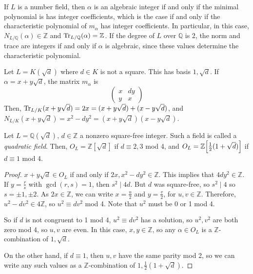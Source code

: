 If \( L \) is a number field, then \( \alpha \) is an algebraic integer if and only if the minimal polynomial is has integer coefficients, which is the case if and only if the characteristic polynomial of \( m_\alpha \) has integer coefficients.
In particular, in this case, \( N_{L/\mathbb Q}(\alpha) \in \mathbb Z \) and \( \Tr_{L/\mathbb Q}(\alpha) = \mathbb Z \).
If the degree of \( L \) over \( \mathbb Q \) is 2, the norm and trace are integers if and only if \( \alpha \) is algebraic, since these values determine the characteristic polynomial.
\begin{example}
    Let \( L = K(\sqrt{d}) \) where \( d \in K \) is not a square.
    This has basis \( 1, \sqrt d \).
    If \( \alpha = x + y\sqrt d \), the matrix \( m_\alpha \) is
    \[ \begin{pmatrix}
        x & dy \\
        y & x
    \end{pmatrix} \]
    Then, \( \Tr_{L/K}(x+y\sqrt d) = 2x = (x+y\sqrt d) + (x-y\sqrt d) \), and \( N_{L/K}(x+y\sqrt d) = x^2 - dy^2 = (x+y\sqrt d)(x - y\sqrt d) \).
\end{example}
\begin{lemma}
    Let \( L = \mathbb Q(\sqrt{d}) \), \( d \in \mathbb Z \) a nonzero square-free integer.
    Such a field is called a \emph{quadratic field}.
    Then, \( O_L = \mathbb Z[\sqrt d] \) if \( d \equiv 2, 3 \) mod 4, and \( O_L = \mathbb Z\qty[\frac{1}{2}(1+\sqrt d)] \) if \( d \equiv 1 \) mod 4.
\end{lemma}
\begin{proof}
    \( x + y \sqrt d \in O_L \) if and only if \( 2x, x^2 - dy^2 \in \mathbb Z \).
    This implies that \( 4 dy^2 \in \mathbb Z \).
    If \( y = \frac{r}{s} \) with \( \gcd(r,s) = 1 \), then \( s^2 \mid 4d \).
    But \( d \) was square-free, so \( s^2 \mid 4 \) so \( s = \pm 1, \pm 2 \).
    As \( 2x \in \mathbb Z \), we can write \( x = \frac{u}{2} \) and \( y = \frac{v}{2} \), for \( u, v \in \mathbb Z \).
    Therefore, \( u^2 - dv^2 \in 4\mathbb Z \), so \( u^2 \equiv dv^2 \) mod 4.
    Note that \( u^2 \) must be 0 or 1 mod 4.
    
    So if \( d \) is not congruent to 1 mod 4, \( u^2 \equiv dv^2 \) has a solution, so \( u^2, v^2 \) are both zero mod 4, so \( u, v \) are even.
    In this case, \( x, y \in \mathbb Z \), so any \( \alpha \in O_L \) is a \( \mathbb Z \)-combination of \( 1, \sqrt d \).

    On the other hand, if \( d \equiv 1 \), then \( u, v \) have the same parity mod 2, so we can write any such values as a \( \mathbb Z \)-combination of \( 1, \frac{1}{2}(1+\sqrt d) \).
\end{proof}
